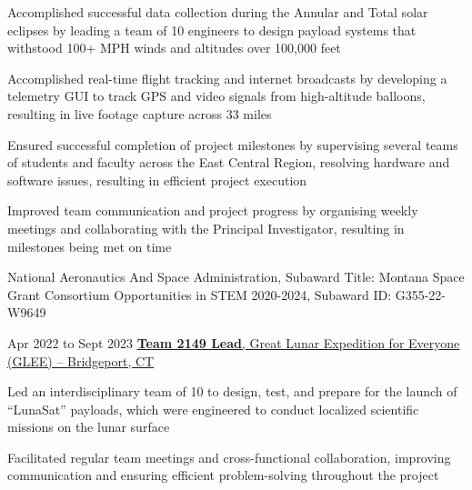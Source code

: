     \vspace{0.15 cm}
    \begin{onecolentry}
        \begin{highlights}
            \item Accomplished successful data collection during the Annular and Total solar eclipses by leading a team of 10 engineers to design payload systems that withstood 100+ MPH winds and altitudes over 100,000 feet
            \item Accomplished real-time flight tracking and internet broadcasts by developing a telemetry GUI to track GPS and video signals from high-altitude balloons, resulting in live footage capture across 33 miles
            \item Ensured successful completion of project milestones by supervising several teams of students and faculty across the East Central Region, resolving hardware and software issues, resulting in efficient project execution
            \item Improved team communication and project progress by organising weekly meetings and collaborating with the Principal Investigator, resulting in milestones being met on time
            \item National Aeronautics And Space Administration, Subaward Title: Montana Space Grant Consortium Opportunities in STEM 2020-2024, Subaward ID: G355-22-W9649
        \end{highlights}
    \end{onecolentry}

    \vspace{0.2 cm}

    \begin{twocolentry}{
        Apr 2022 to Sept 2023
    }
        \href{https://www.glee2023.org}{\textbf{Team 2149 Lead}, Great Lunar Expedition for Everyone (GLEE) -- Bridgeport, CT}
    \end{twocolentry}

    \vspace{0.15 cm}
    \begin{onecolentry}
        \begin{highlights}
          \item Led an interdisciplinary team of 10 to design, test, and prepare for the launch of “LunaSat” payloads, which were engineered to conduct localized scientific missions on the lunar surface
          \item Facilitated regular team meetings and cross-functional collaboration, improving communication and ensuring efficient problem-solving throughout the project
        \end{highlights}
    \end{onecolentry}
